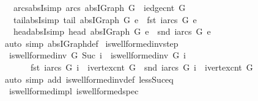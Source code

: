 \begin{isabellebody}
\ \ \ arcs{\isacharunderscore}absI{\isacharbrackleft}simp{\isacharbrackright}{\isacharcolon}\ {\isachardoublequoteopen}arcs\ {\isacharparenleft}abs{\isacharunderscore}IGraph\ G{\isacharparenright}\ {\isacharequal}\ {\isacharbraceleft}{}{\isachardot}{\isachardot}{\isacharless}iedge{\isacharunderscore}cnt\ G{\isacharbraceright}{\isachardoublequoteclose}\isanewline
\ \ \ tail{\isacharunderscore}absI{\isacharbrackleft}simp{\isacharbrackright}{\isacharcolon}\ {\isachardoublequoteopen}tail\ {\isacharparenleft}abs{\isacharunderscore}IGraph\ G{\isacharparenright}\ e\ {\isacharequal}\ fst\ {\isacharparenleft}iarcs\ G\ e{\isacharparenright}{\isachardoublequoteclose}\isanewline
\ \ \ head{\isacharunderscore}absI{\isacharbrackleft}simp{\isacharbrackright}{\isacharcolon}\ {\isachardoublequoteopen}head\ {\isacharparenleft}abs{\isacharunderscore}IGraph\ G{\isacharparenright}\ e\ {\isacharequal}\ snd\ {\isacharparenleft}iarcs\ G\ e{\isacharparenright}{\isachardoublequoteclose}\isanewline
%
\isadelimproof
\ \ %
\endisadelimproof
%
\isatagproof
{}\isamarkupfalse%
\ {\isacharparenleft}auto\ simp{\isacharcolon}\ abs{\isacharunderscore}IGraph{\isacharunderscore}def{\isacharparenright}%
\endisatagproof
{\isafoldproof}%
%
\isadelimproof
\isanewline
%
\endisadelimproof
\isanewline
{}\isamarkupfalse%
\ is{\isacharunderscore}wellformed{\isacharunderscore}inv{\isacharunderscore}step{\isacharcolon}\isanewline
\ \ {\isachardoublequoteopen}is{\isacharunderscore}wellformed{\isacharunderscore}inv\ G\ {\isacharparenleft}Suc\ i{\isacharparenright}\ {\isasymlongleftrightarrow}\ is{\isacharunderscore}wellformed{\isacharunderscore}inv\ G\ i\isanewline
\ \ \ \ \ \ {\isasymand}\ fst\ {\isacharparenleft}iarcs\ G\ i{\isacharparenright}\ {\isacharless}\ ivertex{\isacharunderscore}cnt\ G\ {\isasymand}\ snd\ {\isacharparenleft}iarcs\ G\ i{\isacharparenright}\ {\isacharless}\ ivertex{\isacharunderscore}cnt\ G{\isachardoublequoteclose}\isanewline
%
\isadelimproof
\ \ %
\endisadelimproof
%
\isatagproof
{}\isamarkupfalse%
\ {\isacharparenleft}auto\ simp\ add{\isacharcolon}\ is{\isacharunderscore}wellformed{\isacharunderscore}inv{\isacharunderscore}def\ less{\isacharunderscore}Suc{\isacharunderscore}eq{\isacharparenright}%
\endisatagproof
{\isafoldproof}%
%
\isadelimproof
\isanewline
%
\endisadelimproof
\isanewline
{}\isamarkupfalse%
\ {\isacharparenleft}\ is{\isacharunderscore}wellformed{\isacharunderscore}impl{\isacharparenright}\ is{\isacharunderscore}wellformed{\isacharunderscore}spec{\isacharcolon}\isanewline

\end{isabellebody}
